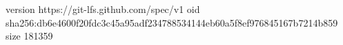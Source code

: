 version https://git-lfs.github.com/spec/v1
oid sha256:db6e4600f20fdc3c45a95adf234788534144eb60a5f8ef976845167b7214b859
size 181359
